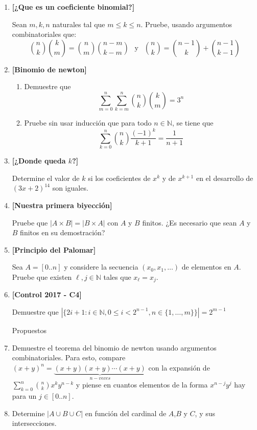 \documentclass[letterpaper,11pt]{article}
\newcommand{\N}{\mathbb N}
\theoremstyle{plain}
\begin{document}
\begin{enumerate}[\bf P1.]
    
    \item \textbf{[¿Que es un coeficiente binomial?]}
    
    Sean $m,k,n$ naturales tal que $m\leq k \leq n$. Pruebe, usando argumentos combinatoriales que:
                $$\binom{n}{k}\binom{k}{m}=\binom{n}{m}\binom{n-m}{k-m} ~~\text{   y   }~~ \binom{n}{k}=\binom{n-1}{k} + \binom{n-1}{k-1}$$
    \item \textbf{[Binomio de newton]}
    \begin{enumerate}
        \item Demuestre que
            $$\displaystyle \sum_{m=0}^{n} \sum_{k=m}^{n} \binom{n}{k}\binom{k}{m} = 3^n$$
        \item Pruebe sin usar inducción que para todo $n\in \N$, se tiene que
            $$\sum_{k=0}^n \binom{n}{k} \dfrac{(-1)^k}{k+1} = \dfrac{1}{n+1}$$
    \end{enumerate}
    
    
    \item \textbf{[¿Donde queda $k$?]}
    
    Determine el valor de $k$ si los coeficientes de $x^k$ y de $x^{k+1}$ en el desarrollo de $(3x+2)^{14}$ son iguales.
    
    \item \textbf{[Nuestra primera biyección]}
    
    Pruebe que $|A\times B|=|B\times A|$ con $A$ y $B$ finitos. ¿Es necesario que sean $A$ y $B$ finitos en su demostración?
    
    \item \textbf{[Principio del Palomar]}
    
    Sea $A=[0..n]$ y considere la secuencia $(x_0,x_1,\dots)$ de elementos en $A$. Pruebe que existen $\ell,j\in \N$ tales que $x_\ell=x_j$.
    
    \item \textbf{[Control 2017 - C4]}
    
    Demuestre que $|\{ 2i+1 : i\in \N, 0\leq i < 2^{n-1}, n \in \{1,\dots,m\}\} |=2^{m-1}$
    
    \begin{center}
        Propuestos
    \end{center}
    
    \item Demuestre el teorema del binomio de newton usando argumentos combinatoriales. Para esto, compare $(x+y)^n=\underbrace{(x+y)(x+y) \cdots (x+y)}_{n-veces}$ con la expansión de $\sum_{k=0}^{n}\binom{n}{k}x^{k}y^{n-k}$ y piense en cuantos elementos de la forma $x^{n-j} y^j$ hay para un $j\in [0..n]$.
    
    \item Determine $|A\cup B \cup C|$ en función del cardinal de $A$,$B$ y $C$, y sus intersecciones.
    
\end{enumerate}
\end{document}

